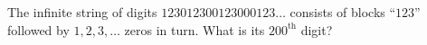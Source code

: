 The infinite string of digits $123012300123000123\dots$ consists of blocks ``$123$'' followed by $1,2,3,\dots$ zeros in turn. What is its $200^{\text{th}}$ digit?
